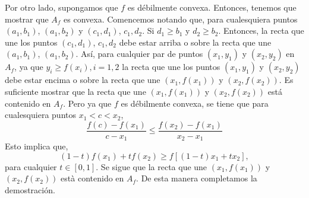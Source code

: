 \begin{enumerate}[\bfseries 1.]
	Por otro lado, supongamos que $f$ es débilmente convexa. Entonces, tenemos que mostrar que $A_f$ es convexa. Comencemos notando que, para cualesquiera puntos $(a_1,b_1)$, $(a_1,b_2)$ y $(c_1,d_1)$, $c_1,d_2$. Si $d_1\geq b_1$ y $d_2\geq b_2$. Entonces, la recta que une los puntos $(c_1,d_1)$, $c_1,d_2$ debe estar arriba o sobre la recta que une $(a_1,b_1)$, $(a_1,b_2)$. Así, para cualquier par de puntos $(x_1,y_1)$ y $(x_2,y_2)$ en $A_f$, ya que $y_i\geq f(x_i),i=1,2$ la recta que une los puntos $(x_1,y_1)$ y $(x_2,y_2)$ debe estar encima o sobre la recta que une $(x_1,f(x_1))$ y $(x_2,f(x_2))$. Es suficiente mostrar que la recta que une $(x_1,f(x_1))$ y $(x_2,f(x_2))$ está contenido en $A_f$. Pero ya que $f$ es débilmente convexa, se tiene que para cualesquiera puntos $x_1<c<x_2$,
	$$\dfrac{f(c)-f(x_1)}{c-x_1}\leq \dfrac{f(x_2)-f(x_1)}{x_2-x_1}$$
	Esto implica que,
	$$(1-t)f(x_1)+tf(x_2)\geq f\left[(1-t)x_1+tx_2\right],$$
	para cualquier $t\in[0,1]$. Se sigue que la recta que une $(x_1,f(x_1))$ y $(x_2,f(x_2))$ està contenido en $A_f$. De esta manera completamos la demostración.

\end{enumerate}
